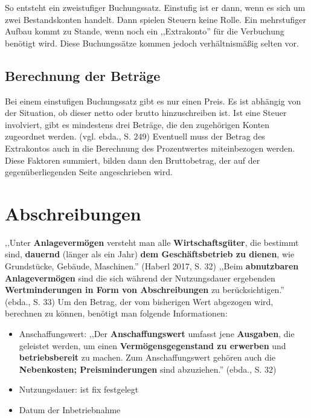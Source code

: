 \documentclass[12pt]{report}
\begin{document}
\noindent So entsteht ein zweistufiger Buchungssatz. Einstufig ist er dann, wenn es sich um zwei Bestandskonten handelt. Dann spielen Steuern keine Rolle. Ein mehrstufiger Aufbau kommt zu Stande, wenn noch ein ,,Extrakonto'' für die Verbuchung benötigt wird. Diese Buchungssätze kommen jedoch verhältnismäßig selten vor.

\subsection{Berechnung der Beträge}
Bei einem einstufigen Buchungssatz gibt es nur einen Preis. Es ist abhängig von der Situation, ob dieser netto oder brutto hinzuschreiben ist. Ist eine Steuer involviert, gibt es mindestens drei Beträge, die den zugehörigen Konten zugeordnet werden. (vgl. ebda., S. 249\nocite{RW1}) Eventuell muss der Betrag des Extrakontos auch in die Berechnung des Prozentwertes miteinbezogen werden. Diese Faktoren summiert, bilden dann den Bruttobetrag, der auf der gegenüberliegenden Seite angeschrieben wird.
 

\section{Abschreibungen}
,,Unter \textbf{Anlagevermögen} versteht man alle \textbf{Wirtschaftsgüter}, die bestimmt sind, \textbf{dauernd} (länger als ein Jahr) \textbf{dem Geschäftsbetrieb zu dienen}, wie Grundstücke, Gebäude, Maschinen.'' (Haberl 2017, S. 32\nocite{RW4}) ,,Beim \textbf{abnutzbaren Anlagevermögen} sind die sich während der Nutzungsdauer ergebenden \textbf{Wertminderungen in Form von Abschreibungen} zu berücksichtigen.'' (ebda., S. 33\nocite{RW4}) Um den Betrag, der vom bisherigen Wert abgezogen wird, berechnen zu können, benötigt man folgende Informationen:
\begin{itemize}
	\item Anschaffungswert: ,,Der \textbf{Anschaffungswert} umfasst jene \textbf{Ausgaben}, die geleistet werden, um einen \textbf{Vermögensgegenstand zu erwerben} und \textbf{betriebsbereit} zu machen. Zum Anschaffungswert gehören auch die \textbf{Nebenkosten; Preisminderungen} sind abzuziehen.'' (ebda., S. 32\nocite{RW4})
	\item Nutzungsdauer: ist fix festgelegt
	\item Datum der Inbetriebnahme
\end{itemize}
\end{document}
